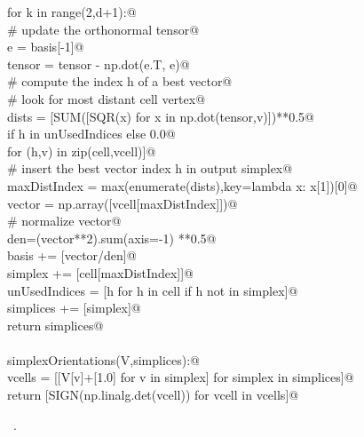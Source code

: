 \documentclass[11pt,oneside]{article}	%
\begin{document}
\begin{flushleft}
\begin{list}{}{}
\mbox{}\verb@      for k in range(2,d+1):@\\
\mbox{}\verb@         # update the orthonormal tensor@\\
\mbox{}\verb@         e = basis[-1]@\\
\mbox{}\verb@         tensor = tensor - np.dot(e.T, e)@\\
\mbox{}\verb@         # compute the index h of a best vector@\\
\mbox{}\verb@         # look for most distant cell vertex@\\
\mbox{}\verb@         dists = [SUM([SQR(x) for x in np.dot(tensor,v)])**0.5@\\
\mbox{}\verb@         if h in unUsedIndices else 0.0@\\
\mbox{}\verb@         for (h,v) in zip(cell,vcell)]@\\
\mbox{}\verb@         # insert the best vector index h in output simplex@\\
\mbox{}\verb@         maxDistIndex = max(enumerate(dists),key=lambda x: x[1])[0]@\\
\mbox{}\verb@         vector = np.array([vcell[maxDistIndex]])@\\
\mbox{}\verb@         # normalize vector@\\
\mbox{}\verb@         den=(vector**2).sum(axis=-1) **0.5@\\
\mbox{}\verb@         basis += [vector/den]@\\
\mbox{}\verb@         simplex += [cell[maxDistIndex]]@\\
\mbox{}\verb@         unUsedIndices = [h for h in cell if h not in simplex]@\\
\mbox{}\verb@      simplices += [simplex]@\\
\mbox{}\verb@   return simplices@\\
\mbox{}\verb@@\\
\mbox{}\verb@def simplexOrientations(V,simplices):@\\
\mbox{}\verb@   vcells = [[V[v]+[1.0] for v in simplex] for simplex in simplices]@\\
\mbox{}\verb@   return [SIGN(np.linalg.det(vcell)) for vcell in vcells]@\\
\mbox{}\verb@@{\NWsep}
\end{list}
\vspace{-1ex}
\footnotesize\addtolength{\baselineskip}{-1ex}
\begin{list}{}{\setlength{\itemsep}{-\parsep}\setlength{\itemindent}{-\leftmargin}}
\item \NWtxtMacroRefIn\ .
\end{list}
\end{flushleft}
\end{document}
